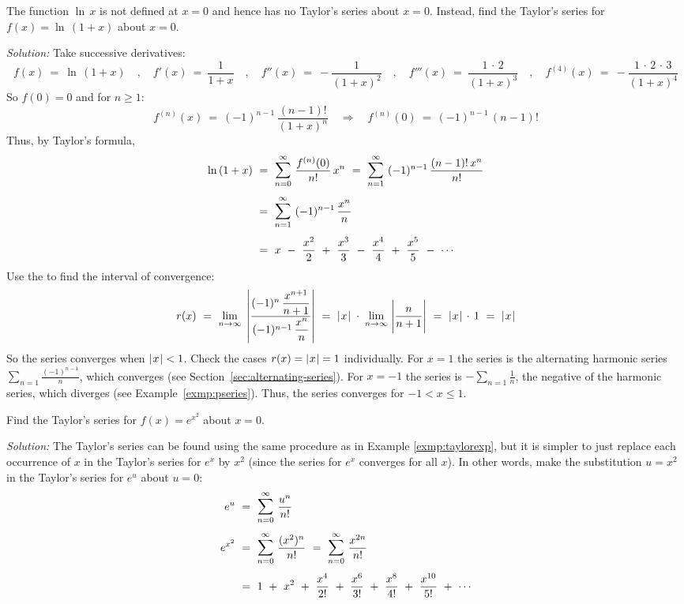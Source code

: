 \begin{exmp}\label{exmp:taylorlog}
\noindent The function $\ln\,x$ is not defined at $x=0$ and hence has no
Taylor's series about $x=0$. Instead, find the Taylor's series for
$f(x)=\ln\,(1+x)$ about $x=0$.\vspace{1mm}
\par\noindent\emph{Solution:} Take successive derivatives:
\[
f(x) ~=~ \ln\,(1+x) \quad,\quad
f'(x) ~=~ \frac{1}{1+x} \quad,\quad
f''(x) ~=~ -\frac{1}{(1+x)^2} \quad,\quad
f'''(x) ~=~ \frac{1 \,\cdot\, 2}{(1+x)^3} \quad,\quad
f^{(4)}(x) ~=~ -\frac{1 \,\cdot\, 2 \,\cdot\, 3}{(1+x)^4}
\]
So $f(0)=0$ and for $n\ge 1$:
\[
f^{(n)}(x) ~=~ (-1)^{n-1}\,\frac{(n-1) !}{(1+x)^n} \quad\Rightarrow\quad
f^{(n)}(0) ~=~ (-1)^{n-1}\,(n-1) !
\]
Thus, by Taylor's formula,
\begin{align*}
\ln\,(1+x) ~&=~ \bigsum{n=0}{\infty}~ \frac{f^{(n)}(0)}{n !}\,x^n ~=~
\bigsum{n=1}{\infty}~ (-1)^{n-1}\,\frac{(n-1) !\,x^{n}}{n !}\\[4pt]
&=~ \bigsum{n=1}{\infty}~ (-1)^{n-1}\,\frac{x^{n}}{n}\\[4pt]
&=~ x ~-~ \frac{x^2}{2} ~+~ \frac{x^3}{3} ~-~ \frac{x^4}{4} ~+~
\frac{x^5}{5} ~-~ \cdots
\end{align*}
Use the  to find the interval of convergence:
\[
r(x) ~=~ \lim_{n \to \infty} \;\left|\dfrac{(-1)^{n}\,\dfrac{x^{n+1}}{n+1}}
{(-1)^{n-1}\,\dfrac{x^{n}}{n}}\right| ~=~
\lvert\mspace{1mu}x\mspace{1mu}\rvert \;\cdot\; \lim_{n \to \infty} \;\Biggl|\frac{n}{n+1}\Biggr| ~=~
\lvert\mspace{1mu}x\mspace{1mu}\rvert \,\cdot\, 1 ~=~ \lvert\mspace{1mu}x\mspace{1mu}\rvert
\]
So the series converges when $\lvert\mspace{1mu}x\mspace{1mu}\rvert < 1$. Check the cases $r(x)=\lvert\mspace{1mu}x\mspace{1mu}\rvert=1$
individually. For $x=1$ the series is the alternating harmonic series
$\sum_{n=1} \frac{(-1)^{n-1}}{n}$, which converges (see Section~\ref{sec:alternating-series}). For $x=-1$ the series is
$-\sum_{n=1} \frac{1}{n}$, the negative of the harmonic series, which diverges (see Example~\ref{exmp:pseries}).
Thus, the series converges for $-1<x\le 1$.
\end{exmp}
\begin{exmp}\label{exmp:taylorexp2}
\noindent Find the Taylor's series for $f(x)=e^{x^2}$ about $x=0$.\vspace{1mm}
\par\noindent\emph{Solution:} The Taylor's series can be found using the same
procedure as in Example \ref{exmp:taylorexp}, but it is simpler to just
replace each occurrence of $x$ in the Taylor's series for $e^x$ by $x^2$ (since
the series for $e^x$ converges for all $x$). In
other words, make the substitution $u=x^2$ in the Taylor's series for $e^u$
about $u=0$:
\begin{align*}
e^u ~&=~ \bigsum{n=0}{\infty}~ \frac{u^n}{n !}\\[4pt]
e^{x^2} ~&=~ \bigsum{n=0}{\infty}~ \frac{(x^2)^n}{n !} ~=~
\bigsum{n=0}{\infty}~ \frac{x^{2n}}{n !}\\[4pt]
&=~ 1 ~+~ x^2 ~+~ \frac{x^4}{2 !} ~+~ \frac{x^6}{3 !} ~+~
\frac{x^8}{4 !} ~+~ \frac{x^{10}}{5 !} ~+~ \cdots
\end{align*}
\end{exmp}
